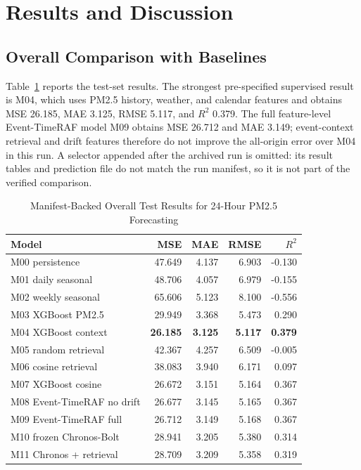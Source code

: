 \section{Results and Discussion}

\subsection{Overall Comparison with Baselines}
Table~\ref{tab:main_results} reports the test-set results. The strongest
pre-specified supervised result is M04, which uses PM2.5 history, weather, and
calendar features and obtains MSE 26.185, MAE 3.125, RMSE 5.117, and $R^2$
0.379. The full feature-level Event-TimeRAF model M09 obtains MSE 26.712 and MAE
3.149; event-context retrieval and drift features therefore do not improve the
all-origin error over M04 in this run. A selector appended after the archived
run is omitted: its result tables and prediction file do not match the run
manifest, so it is not part of the verified comparison.

\begin{table}[!t]
\centering
\caption{Manifest-Backed Overall Test Results for 24-Hour PM2.5 Forecasting}
\label{tab:main_results}
\begin{tabular}{lrrrr}
\toprule
Model & MSE & MAE & RMSE & $R^2$ \\
\midrule
M00 persistence & 47.649 & 4.137 & 6.903 & -0.130 \\
M01 daily seasonal & 48.706 & 4.057 & 6.979 & -0.155 \\
M02 weekly seasonal & 65.606 & 5.123 & 8.100 & -0.556 \\
M03 XGBoost PM2.5 & 29.949 & 3.368 & 5.473 & 0.290 \\
M04 XGBoost context & \textbf{26.185} & \textbf{3.125} & \textbf{5.117} & \textbf{0.379} \\
M05 random retrieval & 42.367 & 4.257 & 6.509 & -0.005 \\
M06 cosine retrieval & 38.083 & 3.940 & 6.171 & 0.097 \\
M07 XGBoost cosine & 26.672 & 3.151 & 5.164 & 0.367 \\
M08 Event-TimeRAF no drift & 26.677 & 3.145 & 5.165 & 0.367 \\
M09 Event-TimeRAF full & 26.712 & 3.149 & 5.168 & 0.367 \\
M10 frozen Chronos-Bolt & 28.941 & 3.205 & 5.380 & 0.314 \\
M11 Chronos + retrieval & 28.709 & 3.209 & 5.358 & 0.319 \\
\bottomrule
\end{tabular}
\end{table}

